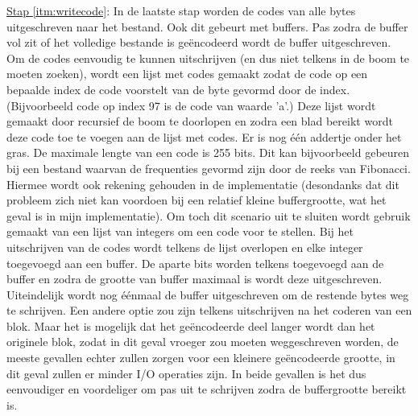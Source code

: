 \documentclass[11pt, a4paper]{article}
\begin{document}
\newline\underline{Stap \ref{itm:writecode}}: In de laatste stap worden de codes van alle bytes uitgeschreven naar het bestand. Ook dit gebeurt met buffers. Pas zodra de buffer vol zit of het volledige bestande is ge\"{e}ncodeerd wordt de buffer uitgeschreven. Om de codes eenvoudig te kunnen uitschrijven (en dus niet telkens in de boom te moeten zoeken), wordt een lijst met codes gemaakt zodat de code op een bepaalde index de code voorstelt van de byte gevormd door de index. (Bijvoorbeeld code op index 97 is de code van waarde 'a'.) Deze lijst wordt gemaakt door recursief de boom te doorlopen en zodra een blad bereikt wordt deze code toe te voegen aan de lijst met codes. Er is nog \'{e}\'{e}n addertje onder het gras. De maximale lengte van een code is 255 bits. Dit kan bijvoorbeeld gebeuren bij een bestand waarvan de frequenties gevormd zijn door de reeks van Fibonacci. Hiermee wordt ook rekening gehouden in de implementatie (desondanks dat dit probleem zich niet kan voordoen bij een relatief kleine buffergrootte, wat het geval is in mijn implementatie). Om toch dit scenario uit te sluiten wordt gebruik gemaakt van een lijst van integers om een code voor te stellen. Bij het uitschrijven van de codes wordt telkens de lijst overlopen en elke integer toegevoegd aan een buffer. De aparte bits worden telkens toegevoegd aan de buffer en zodra de grootte van buffer maximaal is wordt deze uitgeschreven. Uiteindelijk wordt nog \'{e}\'{e}nmaal de buffer uitgeschreven om de restende bytes weg te schrijven. Een andere optie zou zijn telkens uitschrijven na het coderen van een blok. Maar het is mogelijk dat het ge\"{e}ncodeerde deel langer wordt dan het originele blok, zodat in dit geval vroeger zou moeten weggeschreven worden, de meeste gevallen echter zullen zorgen voor een kleinere ge\"{e}ncodeerde grootte, in dit geval zullen er minder I/O operaties zijn. In beide gevallen is het dus eenvoudiger en voordeliger om pas uit te schrijven zodra de buffergrootte bereikt is. 
\end{document}
